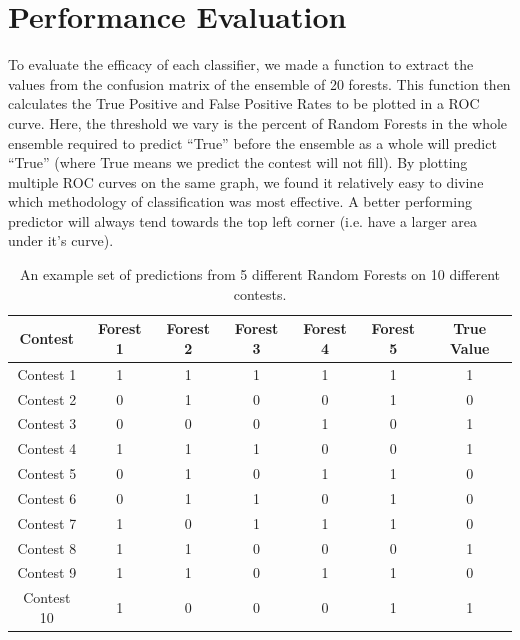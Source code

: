 \section{Performance Evaluation}

To evaluate the efficacy of each classifier, we made a function to extract the values from the confusion matrix of the ensemble of 20 forests. This function then calculates the True Positive and False Positive Rates to be plotted in a ROC curve. Here, the threshold we vary is the percent of Random Forests in the whole ensemble required to predict ``True'' before the ensemble as a whole will predict ``True'' (where True means we predict the contest will not fill). By plotting multiple ROC curves on the same graph, we found it relatively easy to divine which methodology of classification was most effective. A better performing predictor will always tend towards the top left corner (i.e. have a larger area under it's curve).

\begin{table}
\begin{center}
\begin{tabular}{| c | c | c | c | c | c | c |}
\hline
 \textbf{Contest} & \textbf{Forest 1} & \textbf{Forest 2} & \textbf{Forest 3} & \textbf{Forest 4} & \textbf{Forest 5} & \textbf{True Value} \\ 
 \hline
 Contest 1 & 1 & 1 & 1 & 1 & 1 & 1 \\  
 \hline
 Contest 2 & 0 & 1 & 0 & 0 & 1 & 0 \\
 \hline
 Contest 3 & 0 & 0 & 0 & 1 & 0 & 1 \\
 \hline
 Contest 4 & 1 & 1 & 1 & 0 & 0 & 1 \\
 \hline
 Contest 5 & 0 & 1 & 0 & 1 & 1 & 0 \\
 \hline
 Contest 6 & 0 & 1 & 1 & 0 & 1 & 0 \\
 \hline
 Contest 7 & 1 & 0 & 1 & 1 & 1 & 0 \\
 \hline
 Contest 8 & 1 & 1 & 0 & 0 & 0 & 1 \\
 \hline
 Contest 9 & 1 & 1 & 0 & 1 & 1 & 0 \\
 \hline
 Contest 10 & 1 & 0 & 0 & 0 & 1 & 1 \\
 \hline
\end{tabular}
\caption{An example set of predictions from 5 different Random Forests on 10 different contests.}
\end{center}
\end{table}

